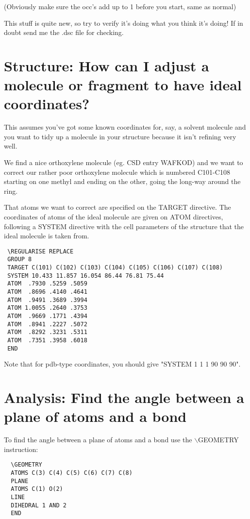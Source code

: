 \documentclass[10pt,a4paper]{report}
\begin{document}
(Obviously make sure the occ's add up to 1 before you start, same
as normal)                               

This stuff is quite new, so try to verify it's doing what you think
it's doing! If in doubt send me the .dsc file for checking.

\section{Structure: How can I adjust a molecule or fragment to have ideal coordinates?}

This assumes you've got some known coordinates for, say, a solvent
molecule and you want to tidy up a molecule in your structure because
it isn't refining very well.



We find a nice orthoxylene molecule (eg. CSD entry
WAFKOD) and we want to correct our rather poor orthoxylene molecule
which is numbered C101-C108 starting on one methyl and ending on
the other, going the long-way around the ring.



That atoms we want to correct are specified on the TARGET directive.
The coordinates of atoms of the ideal molecule are given on ATOM
directives, following a SYSTEM directive with the cell parameters
of the structure that the ideal molecule is taken from.

\small\begin{verbatim}
 \REGULARISE REPLACE
 GROUP 8
 TARGET C(101) C(102) C(103) C(104) C(105) C(106) C(107) C(108)
 SYSTEM 10.433 11.857 16.054 86.44 76.81 75.44
 ATOM  .7930 .5259 .5059
 ATOM  .8696 .4140 .4641
 ATOM  .9491 .3689 .3994
 ATOM 1.0055 .2640 .3753
 ATOM  .9669 .1771 .4394
 ATOM  .8941 .2227 .5072
 ATOM  .8292 .3231 .5311
 ATOM  .7351 .3958 .6018
 END
\end{verbatim}\normalsize


Note that for pdb-type coordinates, you should give "SYSTEM 1 1 1 90 90 90".

\section{Analysis: Find the angle between a plane of atoms and a bond}

To find the angle between a plane of atoms and a bond use the $\backslash$GEOMETRY instruction:



\small\begin{verbatim}
  \GEOMETRY
  ATOMS C(3) C(4) C(5) C(6) C(7) C(8)
  PLANE
  ATOMS C(1) O(2)
  LINE
  DIHEDRAL 1 AND 2
  END
\end{verbatim}\normalsize
\end{document}
